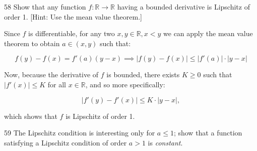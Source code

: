 \begin{exercise}{58}
    Show that any function $f: \mathbb{R} \rightarrow \mathbb{R}$ having a bounded derivative is Lipschitz of order 1.
    [Hint: Use the mean value theorem.]
\end{exercise}

\begin{solution}
    
    Since $f$ is differentiable, for any two $x, y \in \mathbb{R}, x < y$ we can apply the mean value theorem to obtain $a \in (x, y)$ such that:

    \[f(y) - f(x) = f'(a)(y - x) \implies \lvert f(y) - f(x) \rvert \leq \lvert f'(a) \rvert \cdot \lvert y - x \rvert\]

    Now, because the derivative of $f$ is bounded, there exists $K \geq 0$ such that $\lvert f'(x) \rvert \leq K$ for all $x \in \mathbb{R}$, and so more specifically:

    \[\lvert f'(y) - f'(x) \rvert \leq K \cdot \lvert y - x \rvert,\]

    which shows that $f$ is Lipschitz of order 1.
\end{solution}

\newpage

\begin{exercise}{59}
    The Lipschitz condition is interesting only for $a \leq 1$; show that a function satisfying a Lipschitz condition of order $a > 1$ is \textit{constant}.
\end{exercise}

